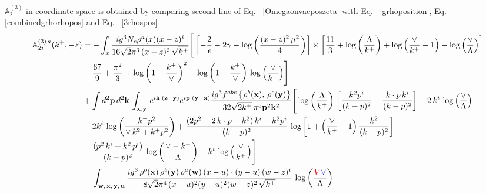 \documentclass[10pt]{article}
\def\mf#1{\mathbb{#1}}
\def\v#1{\mathbf{#1}}
\numberwithin{equation}{section}
\begin{document}
$ \mf{A}^{(3)}_{2}$ in coordinate space is obtained by comparing second line of Eq.~ \eqref{Omegaonvacposzeta} with Eq.~ \eqref{grhoposition}, Eq.~ \eqref{combinedgrhorhopos} and Eq.~ \eqref{3rhospos}
\begin{align}
   \mf{A}^{(3)\,a}_{2i}(k^{+},-z)  & =  -\int_{x} \frac{ig^{3}N_{c}\rho^{a}(x)(x-z)^{i}}{16\sqrt{2}\pi^{3}\,(x-z)^{2}\,\sqrt{k^{+}}}\Bigg[\left[-\frac{2}{\epsilon}-2\gamma -\log{\left(\frac{(x-z)^{2}\,\mu^{2}}{4}\right)}\right]\times \left[\frac{11}{3}+ \log{\left(\frac{\Lambda}{k^{+}}\right)}+\log{\left(\frac{\vee}{k^{+}}-1\right)}-\log{\left(\frac{\vee}{\Lambda}\right)}\right]\notag \\ & -\frac{67}{9}+\frac{\pi^{2}}{3} + \log{\left(1-\frac{k^{+}}{\vee}\right)}^{2}+\log{\left(1-\frac{k^{+}}{\vee}\right)}\,\log{\left(\frac{\vee}{k^{+}}\right)}\Bigg] \notag \\ & +\int d^{2}\mathbf{p}\,d^{2}\mathbf{k}\,\int_{\v{x},\v{y}}\, e^{i\v{k}\cdot (\v{z}-\v{y})} e^{i\v{p}\cdot (\v{y}-\v{x})}\frac{ig^{3}f^{abc}\left\{ \rho^{b}(\mathbf{x}),\,\rho^{c}(\mathbf{y})\right\}}{32\sqrt{2k^{+}}\,\pi^{5}\mathbf{p}^{2}\mathbf{k}^{2}}\Bigg[\log{\left(\frac{\Lambda}{k^{+}}\right)}\,\left[\frac{k^{2}p^{i}}{(k-p)^{2}}-\frac{k\cdot p\,k^{i}}{(k-p)^{2}}\right]-2\,k^{i}\,\log{\left(\frac{\vee}{\Lambda}\right)}\notag \\ & -2k^{i}\,\log{\left(\frac{k^{+}p^{2}}{\vee\, k^{2}+k^{+}p^{2}}\right)}+\frac{(2p^{2}-2\,k\cdot p + k^{2})\,k^{i} + k^{2}p^{i}}{(k-p)^{2}}\, \log{\left[1+\left(\frac{\vee}{k^{+}}-1\right)\frac{k^{2}}{(k-p)^{2}}\right]}\notag \\ & - \frac{(p^{2}\,k^{i}+k^{2}\,p^{i})}{(k-p)^{2}}\, \log{\left(\frac{\vee - k^{+}}{\Lambda}\right)}-k^{i}\, \log{\left(\frac{\vee}{k^{+}}\right)}\Bigg]\notag \\ & -\,\int_{\mathbf{w},\, \mathbf{x},\, \mathbf{y},\, \mathbf{u}}\frac{ig^{3}\,\rho^{b}(\mathbf{x})\,\rho^{b}(\mathbf{y})\,\rho^{a}(\mathbf{w})\, (x-u)\cdot (y-u)\,(w-z)^{i}}{8\sqrt{2}\pi^{4}\,(x-u)^{2}(y-u)^{2}(w-z)^{2}\,\sqrt{k^{+}}}\,\log{\left(\frac{\textcolor{red}{V}\textcolor{blue}{\vee}}{\Lambda}\right)} %
\end{align}
\end{document}

